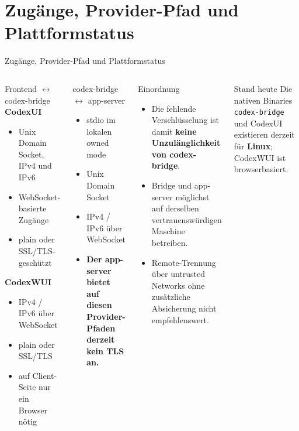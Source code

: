 \documentclass[\fhformat,10pt]{style/fh-ooe}
\begin{document}
\section{Zugänge, Provider-Pfad und Plattformstatus}
\begin{frame}{Zugänge, Provider-Pfad und Plattformstatus}
\footnotesize
\begin{columns}[T]
\begin{block}{Frontend $\leftrightarrow$ codex-bridge}
\textbf{CodexUI}
\begin{itemize}
  \item Unix Domain Socket, IPv4 und IPv6
  \item WebSocket-basierte Zugänge
  \item plain oder SSL/TLS-geschützt
\end{itemize}
\textbf{CodexWUI}
\begin{itemize}
  \item IPv4 / IPv6 über WebSocket
  \item plain oder SSL/TLS
  \item auf Client-Seite nur ein Browser nötig
\end{itemize}
\end{block}
\begin{block}{codex-bridge $\leftrightarrow$ app-server}
\begin{itemize}
  \item stdio im lokalen owned mode
  \item Unix Domain Socket
  \item IPv4 / IPv6 über WebSocket
  \item \textbf{Der app-server bietet auf diesen Provider-Pfaden derzeit kein TLS an.}
\end{itemize}
\end{block}
\begin{alertblock}{Einordnung}
\begin{itemize}
  \item Die fehlende Verschlüsselung ist damit \textbf{keine Unzulänglichkeit von codex-bridge}.
  \item Bridge und app-server möglichst auf derselben vertrauenswürdigen Maschine betreiben.
  \item Remote-Trennung über untrusted Networks ohne zusätzliche Absicherung nicht empfehlenswert.
\end{itemize}
\end{alertblock}
\begin{block}{Stand heute}
Die nativen Binaries \texttt{codex-bridge} und CodexUI existieren derzeit für \textbf{Linux}; CodexWUI ist browserbasiert.
\end{block}
\end{columns}
\end{frame}
\end{document}
